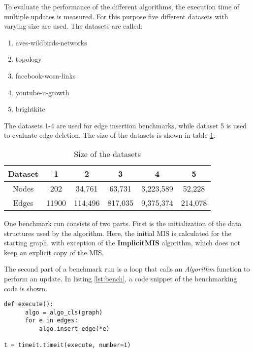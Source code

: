 \documentclass[letterpaper,11pt]{article}
\begin{document}
To evaluate the performance of the different algorithms, the execution time of
multiple updates is measured. For this purpose five different datasets with
varying size are used. The datasets are called:

\begin{enumerate}
  \itemsep 0em
  \item aves-wildbirds-networks \cite{wildbirds}
  \item topology \cite{konect:2016:topology, konect:zhang05, konect}
  \item facebook-wosn-links \cite{konect:2016:facebook-wosn-links, viswanath09, konect}
  \item youtube-u-growth \cite{konect:2016:youtube-u-growth, konect:mislove2, konect}
  \item brightkite \cite{konect:2016:loc-brightkite_edges, konect:cho2011, konect}
\end{enumerate}

The datasets 1-4 are used for edge insertion benchmarks, while dataset 5 is
used to evaluate edge deletion. The size of the datasets is shown in table \ref{tab:datasets}.

\begin{table}[h]
  \caption{Size of the datasets}
  \label{tab:datasets}
  \centering
  \setlength{\extrarowheight}{0.3em}
  \begin{tabular}{|c|c|c|c|c|c|}
    \hline
    Dataset & 1 & 2 & 3 & 4 & 5 \\
    \hline
    \hline
    Nodes & 202 & 34,761 & 63,731 & 3,223,589 & 52,228 \\
    \hline
    Edges & 11900 & 114,496 & 817,035 & 9,375,374 & 214,078 \\
    \hline
  \end{tabular}
\end{table}

One benchmark run consists of two parts. First is the initialization of the data
structures used by the algorithm. Here, the initial MIS is calculated for the
starting graph, with exception of the \textbf{ImplicitMIS} algorithm, which does
not keep an explicit copy of the MIS.

The second part of a benchmark run is a loop that calls an \textit{Algorithm}
function to perform an update. In listing \ref{lst:bench}, a code snippet of the
benchmarking code is shown.


\begin{lstlisting}[label={lst:bench}, caption=Benchmark Code Snippet]
def execute():
      algo = algo_cls(graph)
      for e in edges:
          algo.insert_edge(*e)

t = timeit.timeit(execute, number=1)
\end{lstlisting}
\end{document}
